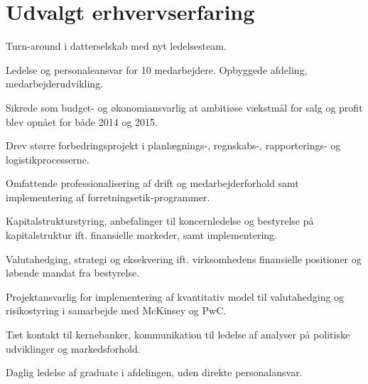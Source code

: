 \documentclass[a4paper]{janus-resume} %
\begin{document}
\hfill
%
%
\begin{minipage}[t]{0.49\textwidth} %


\section{Udvalgt erhvervserfaring}


\vspace{\topsep} %
\begin{tightitemize}
\item Turn-around i datterselskab med nyt ledelsesteam. 
\item Ledelse og personaleansvar for 10 medarbejdere. Opbyggede afdeling, medarbejderudvikling.
\item Sikrede som budget- og økonomiansvarlig at ambitiøse vækstmål for salg og profit blev opnået for både 2014 og 2015.
\item Drev større forbedringsprojekt i planlægnings-, regnskabs-, rapporterings- og logistikprocesserne.
\item Omfattende professionalisering af drift og medarbejderforhold samt implementering af forretningsetik-programmer. 
\end{tightitemize}

\sectionspace %



\begin{tightitemize}
\item Kapitalstrukturstyring, anbefalinger til koncernledelse og bestyrelse på kapitalstruktur ift. finansielle markeder, samt
implementering.
\item Valutahedging, strategi og eksekvering ift. virksomhedens finansielle positioner og løbende mandat fra bestyrelse.
\item Projektansvarlig for implementering af kvantitativ model til valutahedging og risikostyring i samarbejde med McKinsey og PwC. 
\item Tæt kontakt til kernebanker, kommunikation til ledelse af analyser på politiske udviklinger og markedsforhold.
\item Daglig ledelse af graduate i afdelingen, uden direkte personalansvar.
\end{tightitemize}


\end{minipage}
\end{document}
